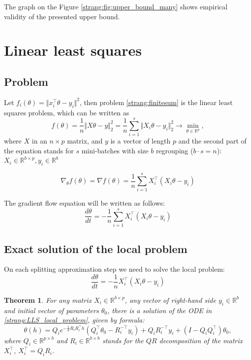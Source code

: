 \documentclass{article} %
\newtheorem{theorem}{Theorem}
\begin{document}
The graph on the Figure \ref{strang:fig:upper_bound_many} shows empirical validity of the presented upper bound.

\section{Linear least squares}
\subsection{Problem}
Let $f_i(\theta) = \Vert x_i^{\top} \theta - y_i \Vert^2$, then problem \eqref{strang:finitesum} is the linear least squares problem, which can be written as
\begin{equation}\label{strang:LLS}
   f(\theta) = \dfrac{1}{n}\Vert X \theta - y \Vert_2^2  = \dfrac{1}{n}\sum\limits_{i=1}^s\Vert X_i \theta - y_i \Vert_2^2\to \min_{\theta \in \mathbb{R}^p},
\end{equation}
where $X$ in an $n \times p$ matrix, and $y$ is a vector of length $p$ and the second part of the equation stands for $s$ mini-batches with size $b$ regrouping ($b \cdot s = n$): $X_i \in \mathbb{R}^{b \times p}, y_i \in \mathbb{R}^{b}$

\begin{equation}\label{strang:LLS_grad}
\nabla_\theta f(\theta) = \nabla f(\theta) = \dfrac{1}{n}\sum\limits_{i=1}^s X_i^\top( X_i \theta - y_i)
\end{equation}

The gradient flow equation will be written as follows:
\begin{equation}\label{strang:LLS_GF}
\dfrac{d \theta}{d t} = - \dfrac{1}{n}\sum\limits_{i=1}^s X_i^\top( X_i \theta - y_i)
\end{equation}

\subsection{Exact solution of the local problem}
On each splitting approximation step we need to solve the local problem:
\begin{equation}\label{strang:LLS_local_problem}
\dfrac{d \theta}{d t} = - \dfrac{1}{n} X_i^\top( X_i \theta - y_i)
\end{equation}
\begin{theorem}\label{strang:LLS_local_solution} For any matrix $X_i \in \mathbb{R}^{b \times p}$, any vector of right-hand side $y_i \in \mathbb{R}^{b}$ and initial vector of parameters $\theta_0$, there is a solution of the ODE in \ref{strang:LLS_local_problem}, given by formula:
$$
\theta(h) = Q_i e^{-\frac{1}{n}R_iR_i^\top h} \left( Q_i^\top \theta_0 - R_i^{-\top}y_i\right) + Q_iR_i^{-\top}y_i + (I - Q_iQ_i^\top)\theta_0,
$$ 
where $Q_i \in \mathbb{R}^{p \times b}$ and $R_i \in \mathbb{R}^{b \times b}$ stands for the $QR$ decomposition of the matrix $X_i^\top$, $X_i^\top = Q_i R_i$.
\end{theorem}
\end{document}
